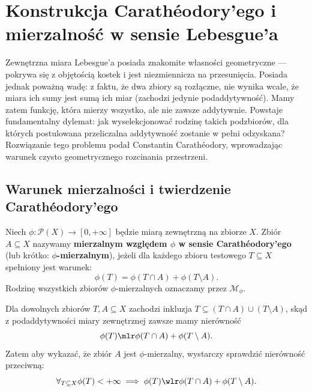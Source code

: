 \section{Konstrukcja Carathéodory'ego i mierzalność w sensie Lebesgue'a}
Zewnętrzna miara Lebesgue’a posiada znakomite własności geometryczne — pokrywa się z objętością kostek i jest niezmiennicza na przesunięcia. Posiada jednak poważną wadę: z faktu, że dwa zbiory są rozłączne, nie wynika wcale, że miara ich sumy jest sumą ich miar (zachodzi jedynie podaddytywność). Mamy zatem funkcję, która mierzy wszystko, ale nie zawsze addytywnie. Powstaje fundamentalny dylemat: jak wyselekcjonować rodzinę takich podzbiorów, dla których postulowana przeliczalna addytywność zostanie w pełni odzyskana? Rozwiązanie tego problemu podał Constantin Carathéodory, wprowadzając warunek czysto geometrycznego rozcinania przestrzeni.

\subsection{Warunek mierzalności i twierdzenie Carathéodory'ego} \begin{defi} Niech $\phi \colon \mathcal{P}(X) \to [0, +\infty]$ będzie miarą zewnętrzną na zbiorze $X$. Zbiór $A \subseteq X$ nazywamy \textbf{mierzalnym względem $\phi$ w sensie Carathéodory'ego} (lub krótko: \textbf{$\phi$-mierzalnym}), jeżeli dla każdego zbioru testowego $T \subseteq X$ spełniony jest warunek:
    \begin{equation}\label{eq:caratheodory_condition}
        \phi(T) = \phi(T \cap A) + \phi(T \setminus A).
    \end{equation}
    Rodzinę wszystkich zbiorów $\phi$-mierzalnych oznaczamy przez $\mathcal{M}_\phi$.
\end{defi}
\begin{uwaga}
    Dla dowolnych zbiorów $T, A \subseteq X$ zachodzi inkluzja $T \subseteq (T \cap A) \cup (T \setminus A)$, skąd z podaddytywności miary zewnętrznej zawsze mamy nierówność
    \begin{equation*}
        \phi(T) \mlr \phi(T \cap A) + \phi(T \setminus A).
    \end{equation*}
    Zatem aby wykazać, że zbiór $A$ jest $\phi$-mierzalny, wystarczy sprawdzić nierówność przeciwną:
    \begin{equation}\label{eq:carath_reduced}
        \forall_{T \subseteq X} \phi(T) < +\infty \implies \phi(T) \wlr \phi(T \cap A) + \phi(T \setminus A).
    \end{equation}
\end{uwaga}

